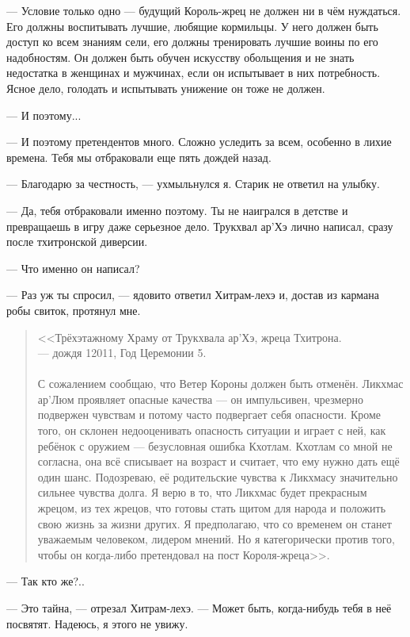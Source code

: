 --- Условие только одно --- будущий Король-жрец не должен ни в чём нуждаться.
Его должны воспитывать лучшие, любящие кормильцы.
У него должен быть доступ ко всем знаниям сели, его должны тренировать лучшие воины по его надобностям.
Он должен быть обучен искусству обольщения и не знать недостатка в женщинах и мужчинах, если он испытывает в них потребность.
Ясное дело, голодать и испытывать унижение он тоже не должен.

--- И поэтому...

--- И поэтому претендентов много.
Сложно уследить за всем, особенно в лихие времена.
Тебя мы отбраковали еще пять дождей назад.

--- Благодарю за честность, --- ухмыльнулся я.
Старик не ответил на улыбку.

--- Да, тебя отбраковали именно поэтому.
Ты не наигрался в детстве и превращаешь в игру даже серьезное дело.
Трукхвал ар'Хэ лично написал, сразу после тхитронской диверсии.

--- Что именно он написал?

--- Раз уж ты спросил, --- ядовито ответил Хитрам-лехэ и, достав из кармана робы свиток, протянул мне.

\begin{quote}
<<Трёхэтажному Храму от Трукхвала ар'Хэ, жреца Тхитрона.\\
--- дождя 12011, Год Церемонии 5.\\
~\\
С сожалением сообщаю, что Ветер Короны должен быть отменён.
Ликхмас ар'Люм проявляет опасные качества --- он импульсивен, чрезмерно подвержен чувствам и потому часто подвергает себя опасности.
Кроме того, он склонен недооценивать опасность ситуации и играет с ней, как ребёнок с оружием --- безусловная ошибка Кхотлам.
Кхотлам со мной не согласна, она всё списывает на возраст и считает, что ему нужно дать ещё один шанс.
Подозреваю, её родительские чувства к Ликхмасу значительно сильнее чувства долга.
Я верю в то, что Ликхмас будет прекрасным жрецом, из тех жрецов, что готовы стать щитом для народа и положить свою жизнь за жизни других.
Я предполагаю, что со временем он станет уважаемым человеком, лидером мнений.
Но я категорически против того, чтобы он когда-либо претендовал на пост Короля-жреца>>.
\end{quote}

--- Так кто же?..

--- Это тайна, --- отрезал Хитрам-лехэ.
--- Может быть, когда-нибудь тебя в неё посвятят.
Надеюсь, я этого не увижу.

